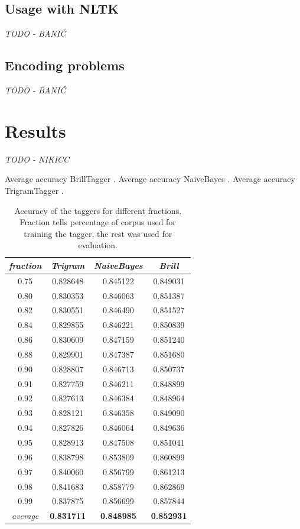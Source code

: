 \documentclass[11pt, conference, compsocconf]{IEEEtran}
\begin{document}
\subsection{Usage with NLTK}
\textit{TODO - BANIČ}
\subsection{Encoding problems}
\textit{TODO - BANIČ}

\section{Results}
\textit{TODO - NIKICC}

Average accuracy BrillTagger .
Average accuracy NaiveBayes .
Average accuracy TrigramTagger .

\begin{table}[htb]
\begin{center}
\begin{tabular}{c|c|c|c}
\textit{fraction} & \textit{Trigram} & \textit{NaiveBayes} & \textit{Brill} \\\hline\hline
0.75 & 0.828648 & 0.845122 & 0.849031\\
0.80 & 0.830353 & 0.846063 & 0.851387\\
0.82 & 0.830551 & 0.846490 & 0.851527\\
0.84 & 0.829855 & 0.846221 & 0.850839\\ 
0.86 & 0.830609 & 0.847159 & 0.851240\\ 
0.88 & 0.829901 & 0.847387 & 0.851680\\ 
0.90 & 0.828807 & 0.846713 & 0.850737\\ 
0.91 & 0.827759 & 0.846211 & 0.848899\\ 
0.92 & 0.827613 & 0.846384 & 0.848964\\ 
0.93 & 0.828121 & 0.846358 & 0.849090\\ 
0.94 & 0.827826 & 0.846064 & 0.849636\\ 
0.95 & 0.828913 & 0.847508 & 0.851041\\
0.96 & 0.838798 & 0.853809 & 0.860899\\
0.97 & 0.840060 & 0.856799 & 0.861213\\
0.98 & 0.841683 & 0.858779 & 0.862869\\
0.99 & 0.837875 & 0.856699 & 0.857844\\ \hline\hline
\textit{average} & \textbf{0.831711} & \textbf{0.848985} & \textbf{0.852931}\\
\end{tabular}
\end{center}
\caption{Accuracy of the taggers for different fractions. Fraction tells percentage of corpus used for training the tagger, the rest was used for evaluation.}
\label{tab:evaluation}
\end{table}
\end{document}
